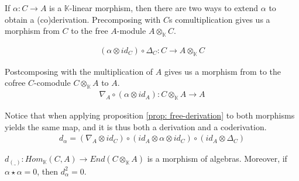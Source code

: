 \documentclass[../thesis.tex]{subfiles}
\begin{document}
            If $\alpha : C \rightarrow A$ is a $\mathbb{K}$-linear morphism, then there are two ways to extend $\alpha$ to obtain a (co)derivation. Precomposing with $C$s comultiplication gives us a morphism from $C$ to the free $A$-module $A\otimes_\mathbb{K} C$.  

            \begin{align*}
                (\alpha \otimes id_C) \circ \Delta_C : C \rightarrow A \otimes_\mathbb{K} C
            \end{align*}

            Postcomposing with the multiplication of $A$ gives us a morphism from to the cofree $C$-comodule $C\otimes_\mathbb{K}A$ to $A$.
            \begin{align*}
                \nabla_A \circ (\alpha \otimes id_A) : C \otimes_\mathbb{K} A \rightarrow A
            \end{align*}

            Notice that when applying proposition \ref{prop: free-derivation} to both morphisms yields the same map, and it is thus both a derivation and a coderivation.
            \begin{align*}
                d_\alpha = (\nabla_A\otimes id_C) \circ (id_A \otimes \alpha \otimes id_C) \circ (id_A \otimes \Delta_C)
            \end{align*}

            \begin{center}
            \end{center} 

            \begin{proposition}\label{prop: convolution to endomorphism}
                $d_{(\_)}:Hom_\mathbb{K}(C,A)\rightarrow End(C\otimes_\mathbb{K}A)$ is a morphism of algebras. Moreover, if $\alpha\star \alpha = 0$, then $d_\alpha^2 = 0$.
            \end{proposition}
\end{document}
